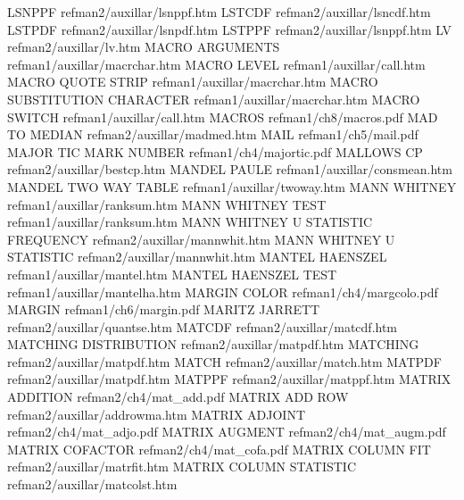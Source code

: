 LSNPPF                                  refman2/auxillar/lsnppf.htm
LSTCDF                                  refman2/auxillar/lsncdf.htm
LSTPDF                                  refman2/auxillar/lsnpdf.htm
LSTPPF                                  refman2/auxillar/lsnppf.htm
LV                                      refman2/auxillar/lv.htm
MACRO ARGUMENTS                         refman1/auxillar/macrchar.htm
MACRO LEVEL                             refman1/auxillar/call.htm
MACRO QUOTE STRIP                       refman1/auxillar/macrchar.htm
MACRO SUBSTITUTION CHARACTER            refman1/auxillar/macrchar.htm
MACRO SWITCH                            refman1/auxillar/call.htm
MACROS                                  refman1/ch8/macros.pdf
MAD TO MEDIAN                           refman2/auxillar/madmed.htm
MAIL                                    refman1/ch5/mail.pdf
MAJOR TIC MARK NUMBER                   refman1/ch4/majortic.pdf
MALLOWS CP                              refman2/auxillar/bestcp.htm
MANDEL PAULE                            refman1/auxillar/consmean.htm
MANDEL TWO WAY TABLE                    refman1/auxillar/twoway.htm
MANN WHITNEY                            refman1/auxillar/ranksum.htm
MANN WHITNEY TEST                       refman1/auxillar/ranksum.htm
MANN WHITNEY U STATISTIC FREQUENCY      refman2/auxillar/mannwhit.htm
MANN WHITNEY U STATISTIC                refman2/auxillar/mannwhit.htm
MANTEL HAENSZEL                         refman1/auxillar/mantel.htm
MANTEL HAENSZEL TEST                    refman1/auxillar/mantelha.htm
MARGIN COLOR                            refman1/ch4/margcolo.pdf
MARGIN                                  refman1/ch6/margin.pdf
MARITZ JARRETT                          refman2/auxillar/quantse.htm
MATCDF                                  refman2/auxillar/matcdf.htm
MATCHING DISTRIBUTION                   refman2/auxillar/matpdf.htm
MATCHING                                refman2/auxillar/matpdf.htm
MATCH                                   refman2/auxillar/match.htm
MATPDF                                  refman2/auxillar/matpdf.htm
MATPPF                                  refman2/auxillar/matppf.htm
MATRIX ADDITION                         refman2/ch4/mat_add.pdf
MATRIX ADD ROW                          refman2/auxillar/addrowma.htm
MATRIX ADJOINT                          refman2/ch4/mat_adjo.pdf
MATRIX AUGMENT                          refman2/ch4/mat_augm.pdf
MATRIX COFACTOR                         refman2/ch4/mat_cofa.pdf
MATRIX COLUMN FIT                       refman2/auxillar/matrfit.htm
MATRIX COLUMN STATISTIC                 refman2/auxillar/matcolst.htm
